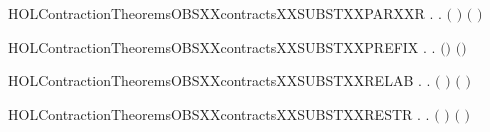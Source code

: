 \newcommand{\HOLContractionTheoremsOBSXXcontractsXXSUBSTXXPARXXL}{\UseVerbatim{HOLContractionTheoremsOBSXXcontractsXXSUBSTXXPARXXL}}
\begin{SaveVerbatim}{HOLContractionTheoremsOBSXXcontractsXXSUBSTXXPARXXR}
\HOLTokenTurnstile{} \HOLSymConst{\HOLTokenForall{}} .
          \HOLSymConst{\HOLTokenImp{}}
       \HOLSymConst{\HOLTokenForall{}}.  \ensuremath{(} \HOLSymConst{\ensuremath{\mid}} \ensuremath{)} \ensuremath{(} \HOLSymConst{\ensuremath{\mid}} \ensuremath{)}
\end{SaveVerbatim}
\newcommand{\HOLContractionTheoremsOBSXXcontractsXXSUBSTXXPARXXR}{\UseVerbatim{HOLContractionTheoremsOBSXXcontractsXXSUBSTXXPARXXR}}
\begin{SaveVerbatim}{HOLContractionTheoremsOBSXXcontractsXXSUBSTXXPREFIX}
\HOLTokenTurnstile{} \HOLSymConst{\HOLTokenForall{}} .    \HOLSymConst{\HOLTokenImp{}} \HOLSymConst{\HOLTokenForall{}}.  \ensuremath{(}\HOLSymConst{\ensuremath{\ldotp}}\ensuremath{)} \ensuremath{(}\HOLSymConst{\ensuremath{\ldotp}}\ensuremath{)}
\end{SaveVerbatim}
\newcommand{\HOLContractionTheoremsOBSXXcontractsXXSUBSTXXPREFIX}{\UseVerbatim{HOLContractionTheoremsOBSXXcontractsXXSUBSTXXPREFIX}}
\begin{SaveVerbatim}{HOLContractionTheoremsOBSXXcontractsXXSUBSTXXRELAB}
\HOLTokenTurnstile{} \HOLSymConst{\HOLTokenForall{}} .
          \HOLSymConst{\HOLTokenImp{}}
       \HOLSymConst{\HOLTokenForall{}}.  \ensuremath{(}  \ensuremath{)} \ensuremath{(}  \ensuremath{)}
\end{SaveVerbatim}
\newcommand{\HOLContractionTheoremsOBSXXcontractsXXSUBSTXXRELAB}{\UseVerbatim{HOLContractionTheoremsOBSXXcontractsXXSUBSTXXRELAB}}
\begin{SaveVerbatim}{HOLContractionTheoremsOBSXXcontractsXXSUBSTXXRESTR}
\HOLTokenTurnstile{} \HOLSymConst{\HOLTokenForall{}} .
          \HOLSymConst{\HOLTokenImp{}} \HOLSymConst{\HOLTokenForall{}}.  \ensuremath{(}  \ensuremath{)} \ensuremath{(}  \ensuremath{)}
\end{SaveVerbatim}
